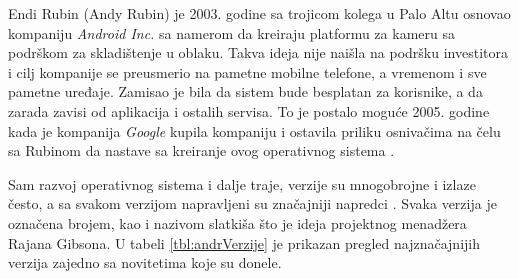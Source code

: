 \documentclass[android.tex]{subfiles}
\begin{document}
Endi Rubin (Andy Rubin) je 2003. godine sa trojicom kolega u Palo Altu osnovao kompaniju \textit{Android Inc. }sa namerom da kreiraju platformu za kameru sa podrškom za skladištenje u oblaku. Takva ideja nije naišla na podršku investitora i cilj kompanije se preusmerio na  pametne mobilne telefone, a vremenom i sve pametne uređaje. Zamisao je bila da sistem bude besplatan za korisnike, a da zarada zavisi od aplikacija i ostalih servisa. To je postalo moguće 2005. godine kada je kompanija \textit{Google} kupila kompaniju i ostavila priliku osnivačima na čelu sa Rubinom da nastave sa kreiranje ovog operativnog sistema \cite{book:krajci}. 

Sam razvoj operativnog sistema i dalje traje, verzije su mnogobrojne i izlaze često, a sa svakom verzijom napravljeni su značajniji napredci \cite{sajt:androidDevelopers,book:mzivkovic}.  Svaka verzija je označena brojem, kao i nazivom slatkiša što je ideja projektnog menadžera Rajana Gibsona. U tabeli \ref{tbl:andrVerzije} je prikazan pregled najznačajnijih verzija zajedno sa novitetima koje su donele. 
\end{document}
